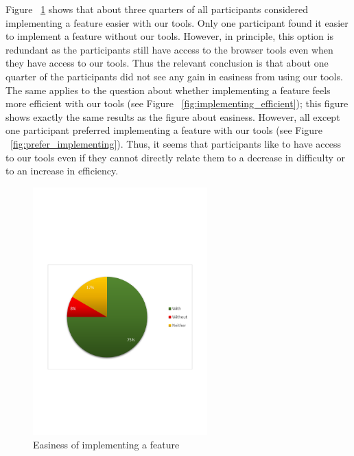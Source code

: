 Figure ~\ref{fig:implementing_easier} shows that about three quarters of all participants considered implementing a feature easier with our tools. Only one participant found it easier to implement a feature without our tools. However, in principle, this option is redundant as the participants still have access to the browser tools even when they have access to our tools. Thus the relevant conclusion is that about one quarter of the participants did not see any gain in easiness from using our tools. The same applies to the question about whether implementing a feature feels more efficient with our tools (see Figure ~\ref{fig:implementing_efficient}); this figure shows exactly the same results as the figure about easiness. However, all except one participant preferred implementing a feature with our tools (see Figure ~\ref{fig:prefer_implementing}). Thus, it seems that participants like to have access to our tools even if they cannot directly relate them to a decrease in difficulty or to an increase in efficiency.
\begin{figure}[H]
  \centering
    \includegraphics[width=0.6\textwidth]{images/charts/implementing_easier.pdf}
	\caption{Easiness of implementing a feature}
	\label{fig:implementing_easier}
\end{figure}

